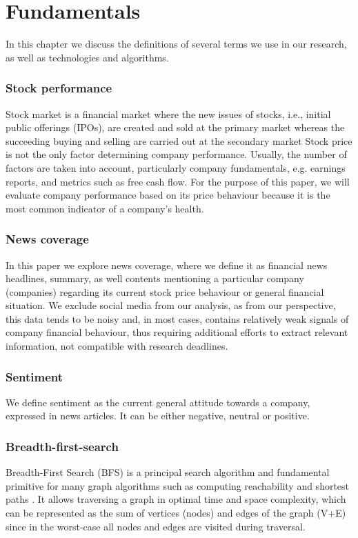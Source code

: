 \chapter{Fundamentals}
\label{cha:fundamentals}

In this chapter we discuss the definitions of several terms we use in our research, as well as technologies and algorithms.

\subsection{Stock performance}
\label{cha:stock-performance}
Stock market is a financial market where the new issues of stocks, i.e., initial public offerings (IPOs), are created and sold at the primary market whereas the succeeding buying and selling are carried out at the secondary market \cite{Fusionin7:online}
Stock price is not the only factor determining company performance. Usually, the number of factors are taken into account, particularly company fundamentals, e.g. earnings reports, and metrics such as free cash flow.
For the purpose of this paper, we will evaluate company performance based on its price behaviour because it is the most common indicator of a company's health.
\subsection{News coverage}
\label{cha:news-coverage}
In this paper we explore news coverage, where we define it as financial news headlines, summary, as well contents mentioning a particular company (companies) regarding its current stock price behaviour or general financial situation.
We exclude social media from our analysis, as from our perspective, this data tends to be noisy and, in most cases, contains relatively weak signals of company financial behaviour, thus requiring additional efforts to extract relevant information, not compatible with research deadlines.

\subsection{Sentiment}
\label{cha:sentiment}
We define sentiment as the current general attitude towards a company, expressed in news articles. It can be either negative, neutral or positive.

\subsection{Breadth-first-search}
\label{cha:breadth-first-search}
Breadth-First Search (BFS) is a principal search algorithm and fundamental primitive for many graph algorithms such as computing reachability and shortest paths \cite{Optimal-1906031125:online}. It allows traversing a graph in optimal time and space complexity, which can be represented as the sum of vertices (nodes) and edges of the graph (V+E) since in the worst-case all nodes and edges are visited during traversal.

